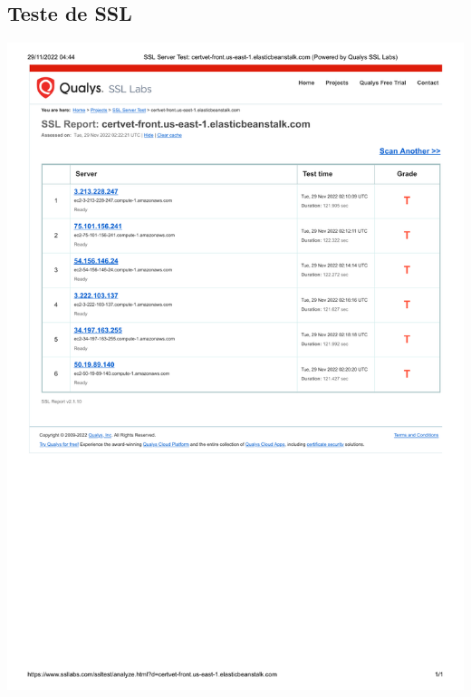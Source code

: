 \documentclass[
    12pt,               %
    openright,          %
    oneside,
    a4paper,            %
    BIBLATEX,           %
    TODO,               %
    english,            %
    brazil              %
    ]{ifsp-spo-inf-ctds}
\begin{document}
\begin{apendicesenv}
\begin {appendices}
\chapter{Teste de SSL}
\includegraphics[page=1, width=1\linewidth,height=0.8\textheight]{Apêndices/sslFront.pdf}
\label{apendiceE}
\end{appendices}

\begin {appendices}

\end{appendices}
\end{apendicesenv}
\end{document}
